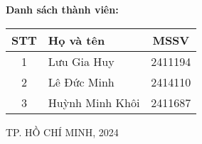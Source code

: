 \documentclass[a4paper]{article}
\theoremstyle{definition}
\begin{document}
\begin{titlepage}
\begin{center}
\vspace{0.5cm}

\textbf{\large Danh sách thành viên:}

\vspace{0.5cm}

\renewcommand{\arraystretch}{2}
\begin{tabular}{|c|m{8cm}|c|}
    \hline
    \textbf{STT} & \textbf{Họ và tên} & \textbf{MSSV} \\
    \hline
    1 & Lưu Gia Huy & 2411194\\
    \hline
    2 & Lê Đức Minh & 2414110\\
    \hline
    3 & Huỳnh Minh Khôi& 2411687\\
    \hline
\end{tabular}
\end{center}


\vspace{0.5cm}
\begin{center}
{\Large TP. HỒ CHÍ MINH, 2024 }
\end{center}
\end{titlepage}
\newpage



\newpage
\tableofcontents
\newpage
\listoffigures
\newpage
\listoftables
\newpage
\setcounter{page}{1}


\newpage

\newpage

\newpage


\newpage

\end{document}

